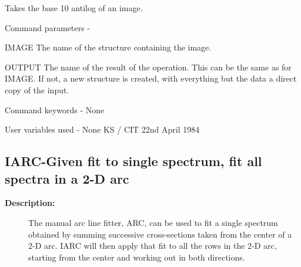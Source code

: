\begin{description}
\begin{description}
\begin{terminalv}
 Takes the base 10 antilog of an image.

 Command parameters -

 IMAGE  The name of the structure containing the image.

 OUTPUT The name of the result of the operation.  This can
        be the same as for IMAGE.  If not, a new structure
        is created, with everything but the data a direct
        copy of the input.

 Command keywords  - None

 User variables used - None
                                  KS / CIT 22nd April 1984
\end{terminalv}
\end{description}
\subsection{IARC-\label{IARC}Given fit to single spectrum, fit all spectra in a 2-D arc}
\begin{description}

\item [\textbf{Description:}]
 The manual arc line fitter, ARC, can be used to fit a single
 spectrum obtained by summing successive cross-sections taken
 from the center of a 2-D arc.  IARC will then apply that fit
 to all the rows in the 2-D arc, starting from the center and
 working out in both directions.


\end{description}
\end{description}
